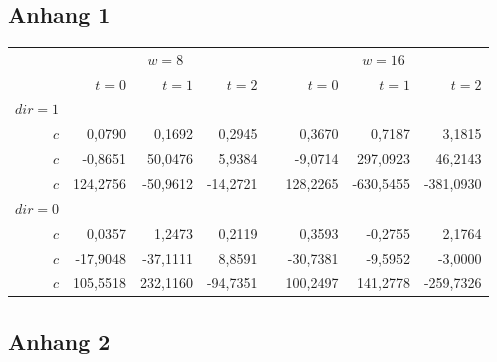 \cleardoublepage
\appendix
\chapter*{\appendixname}
\ihead{\appendixname}								%

\section{Anhang 1}
\begin{table}[htbp]
	\centering
	\renewcommand{\arraystretch}{1.3} %
	\begin{tabular}{@{}rrrrcrrr@{}}
		\toprule
		&\multicolumn{3}{c}{$w = 8$} & \phantom{abc}& \multicolumn{3}{c}{$w = 16$}  \\
		\cmidrule{2-4} \cmidrule{6-8}
		& $t=0$ & $t=1$ & $t=2$ && $t=0$ & $t=1$ & $t=2$  \\
		\midrule
		$dir=1$ \\
		$c$ & 0,0790 & 0,1692 & 0,2945 && 0,3670 & 0,7187 & 3,1815 \\
		$c$ &  -0,8651& 50,0476& 5,9384&& -9,0714& 297,0923& 46,2143\\
		$c$ & 124,2756& -50,9612& -14,2721&& 128,2265& -630,5455& -381,0930\\
		$dir=0$\\
		$c$ & 0,0357& 1,2473& 0,2119&& 0,3593& -0,2755& 2,1764\\
		$c$ & -17,9048& -37,1111& 8,8591&& -30,7381& -9,5952& -3,0000\\
		$c$ & 105,5518& 232,1160& -94,7351&& 100,2497& 141,2778& -259,7326\\
		\bottomrule
	\end{tabular}
	\label{tab:example-table}
\end{table}
\section{Anhang 2}
\lipsum